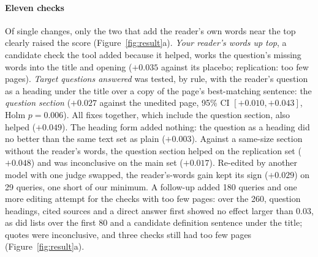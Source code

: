 \paragraph{Eleven checks}
Of single changes, only the two that add the reader's own words near the top clearly raised the score (Figure~\ref{fig:result}a).
\emph{Your reader's words up top}, a candidate check the tool added because it helped, works the question's missing words into the title and opening ($+0.035$ against its placebo; replication: too few pages).
\emph{Target questions answered} was tested, by rule, with the reader's question as a heading under the title over a copy of the page's best-matching sentence: the \emph{question section} ($+0.027$ against the unedited page, 95\% CI $[+0.010, +0.043]$, Holm $p = 0.006$).
All fixes together, which include the question section, also helped ($+0.049$).
The heading form added nothing: the question as a heading did no better than the same text set as plain ($+0.003$).
Against a same-size section without the reader's words, the question section helped on the replication set ($+0.048$) and was inconclusive on the main set ($+0.017$).
Re-edited by another model with one judge swapped, the reader's-words gain kept its sign ($+0.029$) on 29 queries, one short of our minimum.
A follow-up added 180 queries and one more editing attempt for the checks with too few pages: over the 260, question headings, cited sources and a direct answer first showed no effect larger than 0.03, as did lists over the first 80 and a candidate definition sentence under the title; quotes were inconclusive, and three checks still had too few pages (Figure~\ref{fig:result}a).

